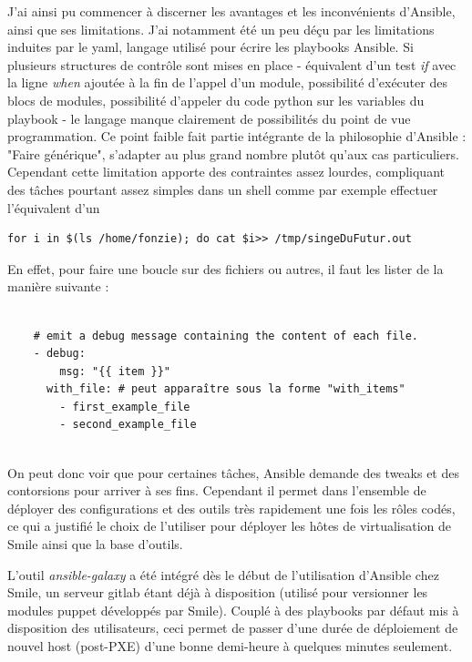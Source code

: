 \documentclass[14 pt]{extreport}
\begin{document}
J'ai ainsi pu commencer à discerner les avantages et les inconvénients d'Ansible, ainsi que ses limitations. J'ai notamment été un peu déçu par les limitations induites par le yaml, langage utilisé pour écrire les playbooks Ansible. Si plusieurs structures de contrôle sont mises en place - équivalent d'un test \emph{if} avec la ligne \emph{when} ajoutée à la fin de l'appel d'un module, possibilité d'exécuter des blocs de modules, possibilité d'appeler du code python sur les variables du playbook - le langage manque clairement de possibilités du point de vue programmation. Ce point faible fait partie intégrante de la philosophie d'Ansible : "Faire générique", s'adapter au plus grand nombre plutôt qu'aux cas particuliers. Cependant cette limitation apporte des contraintes assez lourdes, compliquant des tâches pourtant assez simples dans un shell comme par exemple effectuer l'équivalent d'un \begin{verbatim}for i in $(ls /home/fonzie); do cat $i>> /tmp/singeDuFutur.out \end{verbatim} 

En effet, pour faire une boucle sur des fichiers ou autres, il faut les lister de la manière suivante :

\begin{framed}
\begin{Verbatim}[fontsize=\scriptsize]

    # emit a debug message containing the content of each file.
    - debug:
        msg: "{{ item }}"
      with_file: # peut apparaître sous la forme "with_items"
        - first_example_file
        - second_example_file
        
\end{Verbatim}
\end{framed}

On peut donc voir que pour certaines tâches, Ansible demande des tweaks et des contorsions pour arriver à ses fins. Cependant il permet dans l'ensemble de déployer des configurations et des outils très rapidement une fois les rôles codés, ce qui a justifié le choix de l'utiliser pour déployer les hôtes de virtualisation de Smile ainsi que la base d'outils. 

L'outil \emph{ansible-galaxy} a été intégré dès le début de l'utilisation d'Ansible chez Smile, un serveur gitlab étant déjà à disposition (utilisé pour versionner les modules puppet développés par Smile). Couplé à des playbooks par défaut mis à disposition des utilisateurs, ceci permet de passer d'une durée de déploiement de nouvel host (post-PXE) d'une bonne demi-heure à quelques minutes seulement.
\end{document}
